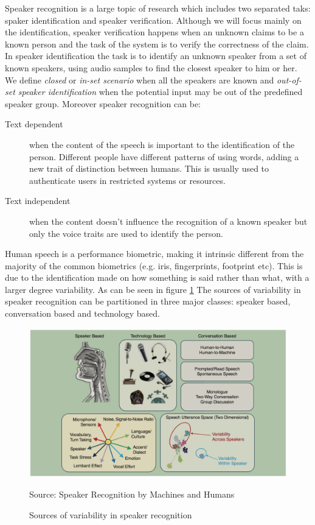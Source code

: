 \begin{itemize}
Speaker recognition is a large topic of research which includes two separated taks: spaker
identification and speaker verification. Although we will focus mainly on the identification,
speaker verification happens when an unknown claims to be a known person and the task
of the system is to verify the correctness of the claim.
In speaker identification the task is to identify an unknown speaker from a set of known speakers,
using audio samples to find the closest speaker to him or her. We define \textit{closed} or \textit{in-set scenario}
when all the speakers are known and \textit{out-of-set speaker identification} when the potential input
may be out of the predefined speaker group.
Moreover speaker recognition can be:
\begin{description}
        \item[Text dependent] when the content of the speech is important to the
        identification of the person. Different people have different patterns of
        using words, adding a new trait of distinction between humans. This is usually
        used to authenticate users in restricted systems or resources.
        \item[Text independent] when the content doesn't influence the recognition
        of a known speaker but only the voice traits are used to identify the person.
\end{description}
Human speech is a performance biometric, making it intrinsic different from the majority
of the common biometrics (e.g. iris, fingerprints, footprint etc). This is due to the
identification made on how something is said rather than what, with a larger
degree variability. As can be seen in figure \ref{fig:sourcesvar} The sources of variability in speaker recognition can be partitioned
in three major classes: speaker based, conversation based and technology based.

\begin{figure}[h]
\caption{Sources of variability in speaker recognition}
\label{fig:sourcesvar}
\centering
\includegraphics[scale=0.20]{sourcesvariability.png}
\par{Source: Speaker Recognition by Machines and Humans}


\end{figure}
\end{itemize}
